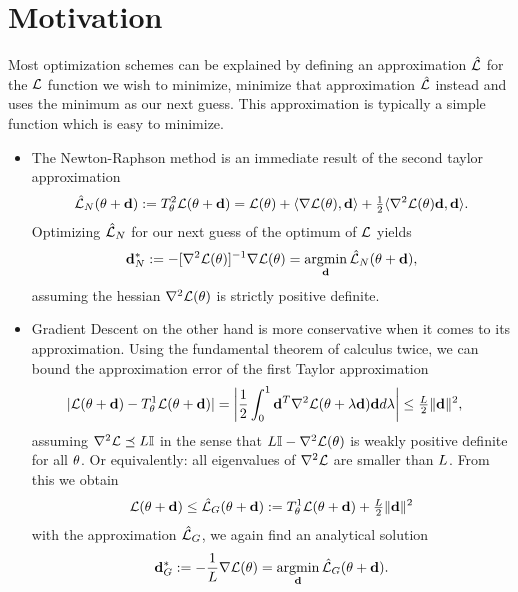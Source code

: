 \section{Motivation}

Most optimization schemes can be explained by defining an approximation 
\(\hat{\mathcal{L}}\) for the \(\mathcal{L}\) function we wish to minimize, minimize that
approximation \(\hat{\mathcal{L}}\) instead and uses the minimum as our next guess.
This approximation is typically a simple function which is easy to minimize.

\begin{itemize}
	\item 
	The Newton-Raphson method is an immediate result of the second taylor approximation
	\begin{align*}
		\hat{\mathcal{L}}_{N}(\theta + \mathbf{d})
		:= T^2_\theta \mathcal{L}(\theta + \mathbf{d})
		= \mathcal{L}(\theta)
		+ \langle \nabla\mathcal{L}(\theta), \mathbf{d}\rangle
		+ \tfrac12 \langle \nabla^2\mathcal{L}(\theta) \mathbf{d}, \mathbf{d}\rangle.
	\end{align*}
	Optimizing \(\hat{\mathcal{L}}_{N}\) for our next guess of the optimum of \(\mathcal{L}\)
	yields
	\begin{align*}
		\mathbf{d}^*_{N} := -[\nabla^2\mathcal{L}(\theta)]^{-1}\nabla\mathcal{L}(\theta)
		= \operatorname*{argmin}_{\mathbf{d}} \hat{\mathcal{L}}_{N}(\theta + \mathbf{d}),
	\end{align*}
	assuming the hessian \(\nabla^2\mathcal{L}(\theta)\) is strictly positive definite.

	\item
	Gradient Descent on the other hand is more conservative when it comes to its
	approximation. Using the fundamental theorem of calculus twice, we can bound
	the approximation error of the first Taylor approximation
	\begin{align*}
		|\mathcal{L}(\theta+\mathbf{d}) - T^1_\theta \mathcal{L}(\theta+\mathbf{d})|
		&= \left| \frac 12 \int_0^1 \mathbf{d}^T \nabla^2\mathcal{L}(\theta + \lambda \mathbf{d})\mathbf{d} d\lambda\right|
		\le \tfrac{L}2 \|\mathbf{d}\|^2,
	\end{align*}
	assuming \(\nabla^2\mathcal{L} \preceq L\mathbb{I}\) in the sense that \(L\mathbb{I}
	- \nabla^2\mathcal{L}(\theta)\) is weakly positive definite for all \(\theta\). Or
	equivalently: all eigenvalues of \(\nabla^2\mathcal{L}\) are smaller than
	\(L\). From this we obtain
	\begin{align*}
		\mathcal{L}(\theta + \mathbf{d}) \le \hat{\mathcal{L}}_G(\theta+\mathbf{d})
		:= T^1_\theta \mathcal{L}(\theta+\mathbf{d}) + \tfrac{L}2\|\mathbf{d}\|^2
	\end{align*}
	with the approximation \(\hat{\mathcal{L}}_{G}\), we again find an analytical
	solution
	\begin{align*}
		\mathbf{d}^*_{G} := - \frac1{L} \nabla\mathcal{L}(\theta)
		= \operatorname*{argmin}_{\mathbf{d}} \hat{\mathcal{L}}_{G}(\theta + \mathbf{d}).
	\end{align*}
\end{itemize}

